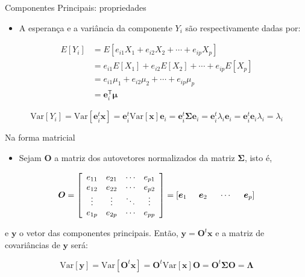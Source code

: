 \documentclass[
  ignorenonframetext,
  aspectratio=169,
]{beamer}
\providecommand{\tightlist}{%
  \setlength{\itemsep}{0pt}\setlength{\parskip}{0pt}}
\begin{document}
\begin{frame}{Componentes Principais: propriedades}
\label{componentes-principais-propriedades}
\begin{itemize}
\tightlist
\item
  A esperança e a variância da componente \(Y_i\) são respectivamente
  dadas por:
\end{itemize}

\[
\begin{aligned}
E[Y_i] 
  &= E[e_{i1}X_1 + e_{i2}X_2 + \cdots + e_{ip}X_p] \\
  &= e_{i1}E[X_1] + e_{i2}E[X_2] + \cdots + e_{ip}E[X_p] \\
  &= e_{i1}\mu_1 + e_{i2}\mu_2 + \cdots + e_{ip}\mu_p \\
  &= \boldsymbol{e}_i^{\mathsf{T}}\boldsymbol{\mu}
\end{aligned}
\]

\pause

\[ \textrm{Var}[Y_i] = \textrm{Var}[{\boldsymbol{e}_i^t}\mathbf{x}] = {\boldsymbol{e}_i^t} \textrm{Var}[\mathbf{x}] {\boldsymbol{e}_i}
 =  {\boldsymbol{e}_i^t} \boldsymbol{\Sigma} {\boldsymbol{e}_i} = {\boldsymbol{e}_i^t} \lambda_i {\boldsymbol{e}_i} =   
{\boldsymbol{e}_i^t} {\boldsymbol{e}_i}\lambda_i = \lambda_i \]
\end{frame}

\begin{frame}{Na forma matricial}
\label{na-forma-matricial}
\begin{itemize}
\tightlist
\item
  Sejam \(\boldsymbol{O}\) a matriz dos autovetores normalizados da
  matriz \(\boldsymbol{\Sigma}\), isto é,
\end{itemize}

\[\boldsymbol{O} = \left[ \begin{array}{cccc} e_{11} & e_{21} & \cdots & e_{p1}
\\ e_{12} & e_{22} & \cdots & e_{p2}
\\ \vdots & \vdots & \ddots & \vdots
\\ e_{1p} & e_{2p} & \cdots & e_{pp} \end{array} \right] = [{\boldsymbol{e}_1} \hspace{0.5cm} {\boldsymbol{e}_2}
\hspace{0.5cm} \cdots \hspace{0.5cm} {\boldsymbol{e}_p}]\]

e \(\boldsymbol{y}\) o vetor das componentes principais. Então,
\(\boldsymbol{y} = \boldsymbol{O}^t \mathbf{x}\) e a matriz de
covariâncias de \(\boldsymbol{y}\) será:

\[\textrm{Var}[\boldsymbol{y}] = \textrm{Var}[\boldsymbol{O}^t \mathbf{x}] =  \boldsymbol{O}^t \textrm{Var}[\mathbf{x}] \boldsymbol{O} =
\boldsymbol{O}^t \boldsymbol{\Sigma} \boldsymbol{O} = \boldsymbol{\Lambda}\]
\end{frame}
\end{document}
